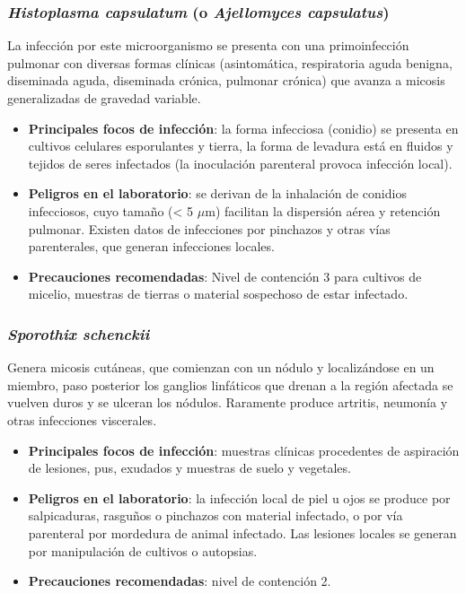 \subsubsection{\textit{Histoplasma capsulatum}  (o \textit{Ajellomyces capsulatus})}
La infección por este microorganismo se presenta con una primoinfección pulmonar con diversas formas clínicas (asintomática, respiratoria aguda benigna, diseminada aguda, diseminada crónica, pulmonar crónica) que avanza a micosis generalizadas de gravedad variable.
\begin{itemize}[itemsep=0pt,parsep=0pt,topsep=0pt,partopsep=0pt]
    \item \textbf{Principales focos de infección}: la forma infecciosa (conidio) se presenta en cultivos celulares esporulantes y tierra, la forma de levadura está en fluidos y tejidos de seres infectados (la inoculación parenteral provoca infección local).
    \item \textbf{Peligros en el laboratorio}:  se derivan de la inhalación de conidios infecciosos, cuyo tamaño (< 5 $\mu$m) facilitan la dispersión aérea y retención pulmonar. Existen datos de infecciones por pinchazos y otras vías parenterales, que generan infecciones locales.
    \item \textbf{Precauciones recomendadas}:  Nivel de contención 3 para cultivos de micelio, muestras de tierras o material sospechoso de estar infectado.
\end{itemize}
\subsubsection{\textit{Sporothix schenckii}}
Genera micosis cutáneas, que comienzan con un nódulo y localizándose en un miembro, paso posterior los ganglios linfáticos que drenan a la región afectada se vuelven duros y se ulceran los nódulos.  Raramente produce artritis, neumonía y otras infecciones viscerales.
\begin{itemize}[itemsep=0pt,parsep=0pt,topsep=0pt,partopsep=0pt]
    \item \textbf{Principales focos de infección}: muestras clínicas procedentes de aspiración de lesiones, pus, exudados y muestras de suelo y vegetales.
    \item \textbf{Peligros en el laboratorio}:  la infección local de piel u ojos se produce por salpicaduras, rasguños o pinchazos con material infectado, o por vía parenteral por mordedura de animal infectado. Las lesiones locales se generan por manipulación de cultivos o autopsias.
    \item \textbf{Precauciones recomendadas}:  nivel de contención 2.
\end{itemize}
